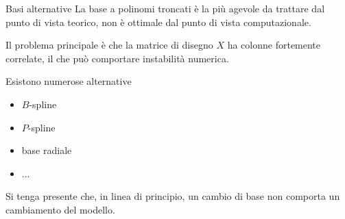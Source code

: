 \documentclass{beamer}\usepackage[]{graphicx}\usepackage[]{color}
\newcommand{\spazio}{\noindent\makebox[\linewidth]{\resizebox{0.1\linewidth}{1pt}{{$\bullet$}}}}
\begin{document}
\begin{frame}{Basi alternative}
La base a polinomi troncati \`e la pi\`u agevole da trattare dal punto di vista teorico, non \`e ottimale dal punto di vista computazionale.

\spazio

Il problema principale \`e che la matrice di disegno $X$ ha colonne fortemente correlate, il che pu\`o comportare instabilit\`a numerica.

\spazio

Esistono numerose alternative
\begin{itemize}
\item $B$-spline
\item $P$-spline
\item base radiale
\item $\ldots$
\end{itemize}

Si tenga presente che, in linea di principio, un cambio di base non comporta un cambiamento del modello.
\end{frame}
\end{document}
